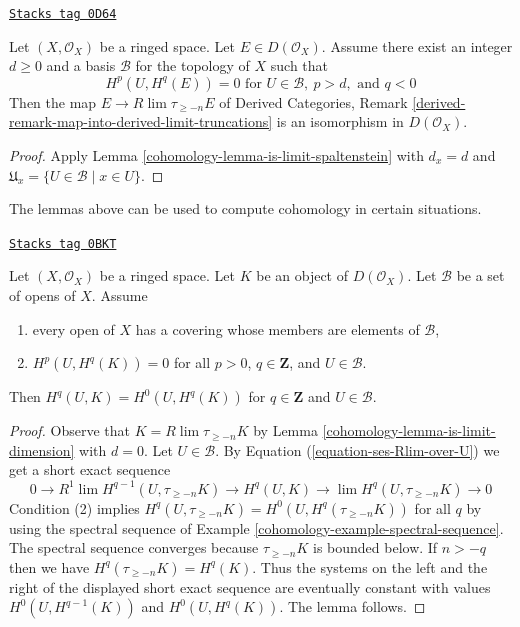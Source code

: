 \begin{lemma}
\label{cohomology-lemma-is-limit-dimension}
\href{https://stacks.math.columbia.edu/tag/0D64}{\texttt{Stacks tag 0D64}}

Let $(X, \mathcal{O}_X)$ be a ringed space. Let $E \in D(\mathcal{O}_X)$.
Assume there exist an integer $d \geq 0$ and a basis $\mathcal{B}$ for the
topology of $X$ such that
$$
H^p(U, H^q(E)) = 0 \text{ for }
U \in \mathcal{B},\ p > d, \text{ and }q < 0
$$
Then the map $E \to R\lim \tau_{\geq -n} E$ of
Derived Categories, Remark
\ref{derived-remark-map-into-derived-limit-truncations}
is an isomorphism in $D(\mathcal{O}_X)$.
\end{lemma}

\begin{proof}

Apply Lemma \ref{cohomology-lemma-is-limit-spaltenstein} with $d_x = d$
and $\mathfrak{U}_x = \{U \in \mathcal{B} \mid x \in U\}$.
\end{proof}

The lemmas above can be used to compute cohomology
in certain situations.

\begin{lemma}
\label{cohomology-lemma-cohomology-over-U-trivial}
\href{https://stacks.math.columbia.edu/tag/0BKT}{\texttt{Stacks tag 0BKT}}

Let $(X, \mathcal{O}_X)$ be a ringed space. Let $K$
be an object of $D(\mathcal{O}_X)$.
Let $\mathcal{B}$ be a set of opens of $X$. Assume
\begin{enumerate}
\item every open of $X$ has a covering whose members are
elements of $\mathcal{B}$,
\item $H^p(U, H^q(K)) = 0$ for all $p > 0$, $q \in \mathbf{Z}$, and
$U \in \mathcal{B}$.
\end{enumerate}
Then $H^q(U, K) = H^0(U, H^q(K))$ for $q \in \mathbf{Z}$
and $U \in \mathcal{B}$.
\end{lemma}

\begin{proof}

Observe that $K = R\lim \tau_{\geq -n} K$ by
Lemma \ref{cohomology-lemma-is-limit-dimension} with $d = 0$.
Let $U \in \mathcal{B}$. By Equation (\ref{equation-ses-Rlim-over-U})
we get a short exact sequence
$$
0 \to R^1\lim H^{q - 1}(U, \tau_{\geq -n}K) \to
H^q(U, K) \to \lim H^q(U, \tau_{\geq -n}K) \to 0
$$
Condition (2) implies
$H^q(U, \tau_{\geq -n} K) = H^0(U, H^q(\tau_{\geq -n} K))$
for all $q$ by using the spectral sequence of
Example \ref{cohomology-example-spectral-sequence}.
The spectral sequence converges because $\tau_{\geq -n}K$ is bounded
below. If $n > -q$ then we have $H^q(\tau_{\geq -n}K) = H^q(K)$.
Thus the systems on the left and the right of the displayed
short exact sequence are eventually constant with values
$H^0(U, H^{q - 1}(K))$ and $H^0(U, H^q(K))$. The lemma follows.
\end{proof}

